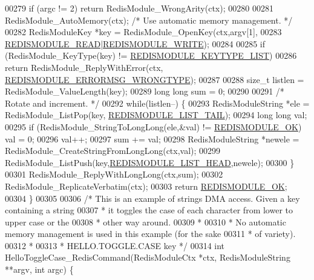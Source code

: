 \begin{DoxyCode}
00279     \textcolor{keywordflow}{if} (argc != 2) \textcolor{keywordflow}{return} RedisModule\_WrongArity(ctx);
00280 
00281     RedisModule\_AutoMemory(ctx); \textcolor{comment}{/* Use automatic memory management. */}
00282     RedisModuleKey *key = RedisModule\_OpenKey(ctx,argv[1],
00283         \hyperlink{redismodule_8h_a369d2ff4bca768b05f826a12dd694825}{REDISMODULE\_READ}|\hyperlink{redismodule_8h_a73b37117ef94cb4a904361afcc51b6b4}{REDISMODULE\_WRITE});
00284 
00285     \textcolor{keywordflow}{if} (RedisModule\_KeyType(key) != \hyperlink{redismodule_8h_a4c01058971d9d8fe1cfa02071fa87fa6}{REDISMODULE\_KEYTYPE\_LIST})
00286         \textcolor{keywordflow}{return} RedisModule\_ReplyWithError(ctx,
      \hyperlink{redismodule_8h_ab897689b0673a1e4cbc097cb5bce04c1}{REDISMODULE\_ERRORMSG\_WRONGTYPE});
00287 
00288     size\_t listlen = RedisModule\_ValueLength(key);
00289     \textcolor{keywordtype}{long} \textcolor{keywordtype}{long} sum = 0;
00290 
00291     \textcolor{comment}{/* Rotate and increment. */}
00292     \textcolor{keywordflow}{while}(listlen--) \{
00293         RedisModuleString *ele = RedisModule\_ListPop(key,
      \hyperlink{redismodule_8h_a15271c33eee2d766df968558d1e0357c}{REDISMODULE\_LIST\_TAIL});
00294         \textcolor{keywordtype}{long} \textcolor{keywordtype}{long} val;
00295         \textcolor{keywordflow}{if} (RedisModule\_StringToLongLong(ele,&val) != \hyperlink{redismodule_8h_a1bc5bfd69abcd378ff52c640adc5418d}{REDISMODULE\_OK}) val = 0;
00296         val++;
00297         sum += val;
00298         RedisModuleString *newele = RedisModule\_CreateStringFromLongLong(ctx,val);
00299         RedisModule\_ListPush(key,\hyperlink{redismodule_8h_a6ca6298fda4f019c7585d34b870fd5f1}{REDISMODULE\_LIST\_HEAD},newele);
00300     \}
00301     RedisModule\_ReplyWithLongLong(ctx,sum);
00302     RedisModule\_ReplicateVerbatim(ctx);
00303     \textcolor{keywordflow}{return} \hyperlink{redismodule_8h_a1bc5bfd69abcd378ff52c640adc5418d}{REDISMODULE\_OK};
00304 \}
00305 
00306 \textcolor{comment}{/* This is an example of strings DMA access. Given a key containing a string}
00307 \textcolor{comment}{ * it toggles the case of each character from lower to upper case or the}
00308 \textcolor{comment}{ * other way around.}
00309 \textcolor{comment}{ *}
00310 \textcolor{comment}{ * No automatic memory management is used in this example (for the sake}
00311 \textcolor{comment}{ * of variety).}
00312 \textcolor{comment}{ *}
00313 \textcolor{comment}{ * HELLO.TOGGLE.CASE key */}
00314 \textcolor{keywordtype}{int} HelloToggleCase\_RedisCommand(RedisModuleCtx *ctx, RedisModuleString **argv, \textcolor{keywordtype}{int} argc) \{

\end{DoxyCode}
